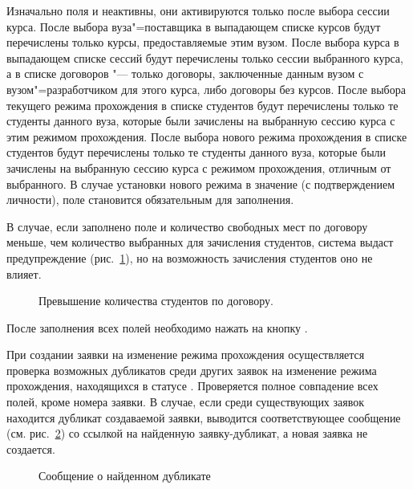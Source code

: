Изначально поля  и  неактивны, они активируются только после выбора сессии курса.
После выбора вуза"=поставщика в выпадающем списке курсов будут перечислены только курсы, предоставляемые этим вузом.
После выбора курса в выпадающем списке сессий будут перечислены только сессии выбранного курса, 
а в списке договоров "--- только договоры, заключенные данным вузом с вузом"=разработчиком для этого курса, 
либо договоры без курсов.
После выбора текущего режима прохождения в списке студентов будут перечислены только те студенты данного вуза, 
которые были зачислены на выбранную сессию курса с этим режимом прохождения.
После выбора нового режима прохождения в списке студентов будут перечислены только те студенты данного вуза, 
которые были зачислены на выбранную сессию курса с режимом прохождения, отличным от выбранного.
В случае установки нового режима в значение  (с подтверждением личности), поле  
становится обязательным для заполнения. 

В случае, если заполнено поле  и количество свободных мест по договору меньше, 
чем количество выбранных для зачисления студентов, система выдаст предупреждение 
(рис.~\ref{img:student:change_mode_req_create_student_error}), но на возможность зачисления студентов оно не влияет.

\begin{figure}[H]
	\caption{Превышение количества студентов по договору.}
	\label{img:student:change_mode_req_create_student_error}
\end{figure}

После заполнения всех полей необходимо нажать на кнопку .

При создании заявки на изменение режима прохождения осуществляется проверка возможных дубликатов среди других заявок 
на изменение режима прохождения, находящихся в статусе . 
Проверяется полное совпадение всех полей, кроме номера заявки. 
В случае, если среди существующих заявок находится дубликат создаваемой заявки, выводится соответствующее сообщение 
(см. рис.~\ref{img:student:req_change_mode_duplicate_msg}) со ссылкой на найденную заявку-дубликат, 
а новая заявка не создается.

\begin{figure}[H]
	\caption{Сообщение о найденном дубликате}
	\label{img:student:req_change_mode_duplicate_msg}
\end{figure}

